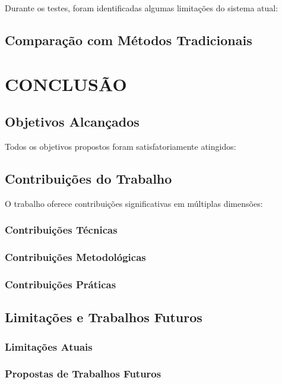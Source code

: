 \documentclass[12pt,a4paper]{article}
\begin{document}
Durante os testes, foram identificadas algumas limitações do sistema atual:

\subsection{Comparação com Métodos Tradicionais}

\newpage
\section{CONCLUSÃO}

\subsection{Objetivos Alcançados}

Todos os objetivos propostos foram satisfatoriamente atingidos:

\subsection{Contribuições do Trabalho}

O trabalho oferece contribuições significativas em múltiplas dimensões:

\subsubsection{Contribuições Técnicas}

\subsubsection{Contribuições Metodológicas}

\subsubsection{Contribuições Práticas}


\subsection{Limitações e Trabalhos Futuros}

\subsubsection{Limitações Atuais}


\subsubsection{Propostas de Trabalhos Futuros}
\end{document}
